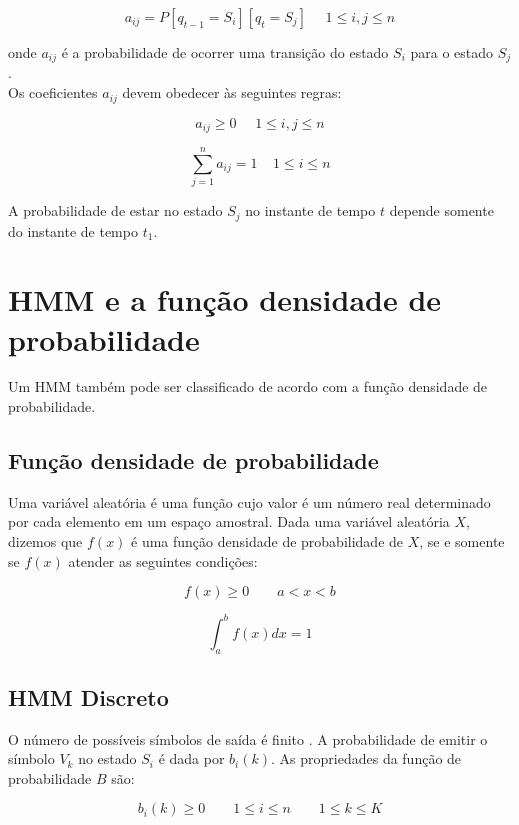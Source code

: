 \begin{equation}
 a_{ij} =  P [q_{t-1} = S_i] [q_t = S_j]~~\textrm{ }~ 1 \leq i, j\leq n
\end{equation}

onde $a_{ij}$ é a probabilidade de ocorrer uma transição do estado $S_i$ para o estado $S_j$.\\
Os coeficientes $a_{ij}$ devem obedecer às seguintes regras:

\begin{equation}
a_{ij} \geq 0~~\textrm{ }~ 1 \leq i,j \leq n 
\end{equation}

\begin{equation}
\displaystyle \sum_{j=1}^n a_{ij} = 1~\textrm{ }~ 1 \leq i \leq n 
\end{equation}

A probabilidade de estar no estado $S_j$ no instante de tempo $t$ depende somente do instante de tempo $t_1$.\\


\section{HMM e a função densidade de probabilidade}

\quad Um HMM também pode ser classificado de acordo com a função densidade de probabilidade. 

\subsection{Função densidade de probabilidade}
\quad Uma variável aleatória é uma função cujo valor é um número real determinado por cada elemento em um espaço amostral. Dada uma variável aleatória $X$, dizemos que $f(x)$ é uma função densidade de probabilidade de $X$, se e somente se $f(x)$ atender as seguintes condições:

$$
\displaystyle f(x) \geq 0  \qquad a < x < b
$$


$$
\displaystyle \int_a^b f(x)dx = 1 
$$

\subsection{HMM Discreto}
\quad O número de possíveis símbolos de saída é finito \cite{fundRecFala}.
 A probabilidade de emitir o símbolo $V_k$ no estado $S_i$ é dada por $b_i(k)$. As propriedades da função de probabilidade $B$ são:

$$
\displaystyle b_i (k) \geq 0 \qquad 1 \leq i \leq n  \qquad 1 \leq k \leq K
$$

